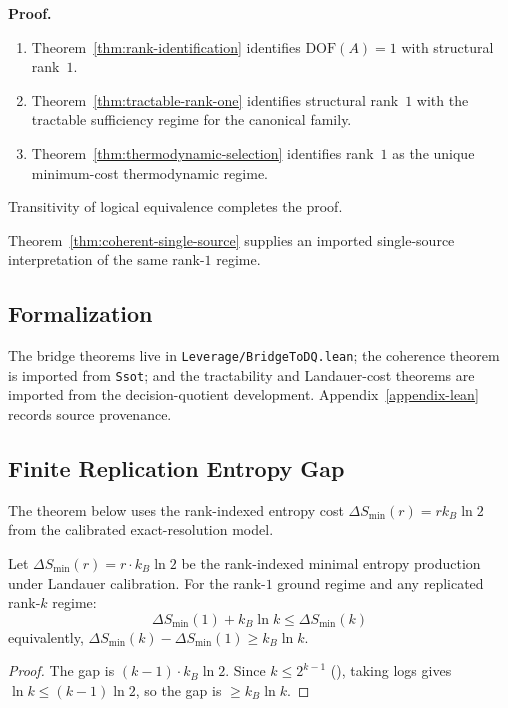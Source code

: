 \textbf{Proof.}
\begin{enumerate}
\item Theorem~\ref{thm:rank-identification} identifies $\mathrm{DOF}(A)=1$ with structural rank~$1$.
\item Theorem~\ref{thm:tractable-rank-one} identifies structural rank~$1$ with the tractable sufficiency regime for the canonical family.
\item Theorem~\ref{thm:thermodynamic-selection} identifies rank~$1$ as the unique minimum-cost thermodynamic regime.
\end{enumerate}
Transitivity of logical equivalence completes the proof.

Theorem~\ref{thm:coherent-single-source} supplies an imported single-source interpretation of the same rank-$1$ regime.

\subsection{Formalization}

The bridge theorems live in \nolinkurl{Leverage/BridgeToDQ.lean}; the coherence theorem is imported from \nolinkurl{Ssot}; and the tractability and Landauer-cost theorems are imported from the decision-quotient development. Appendix~\ref{appendix-lean} records source provenance.

\subsection{Finite Replication Entropy Gap}

The theorem below uses the rank-indexed entropy cost $\Delta S_{\min}(r)=r k_B \ln 2$ from the calibrated exact-resolution model.

\begin{theorem}\label{thm:england}
Let $\Delta S_{\min}(r) = r \cdot k_B \ln 2$ be the rank-indexed minimal entropy production under Landauer calibration. For the rank-$1$ ground regime and any replicated rank-$k$ regime:
\[
\Delta S_{\min}(1) + k_B \ln k \leq \Delta S_{\min}(k)
\]
equivalently, $\Delta S_{\min}(k) - \Delta S_{\min}(1) \geq k_B \ln k$.
\end{theorem}

\begin{proof}
The gap is $(k-1) \cdot k_B \ln 2$. Since $k \leq 2^{k-1}$ (), taking logs gives $\ln k \leq (k-1) \ln 2$, so the gap is $\geq k_B \ln k$.
\end{proof}

